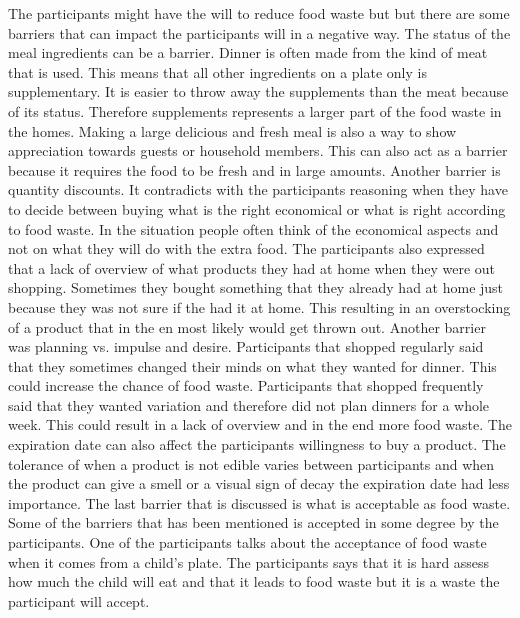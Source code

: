 The participants might have the will to reduce food waste but but there are some barriers that can impact the participants will in a negative way. The status of the meal ingredients can be a barrier. Dinner is often made from the kind of meat that is used. This means that all other ingredients on a plate only is supplementary. It is easier to throw away the supplements than the meat because of its status. Therefore supplements represents a larger part of the food waste in the homes. Making a large delicious and fresh meal is also a way to show appreciation towards guests or household members. This can also act as a barrier because it requires the food to be fresh and in large amounts. Another barrier is quantity discounts. It contradicts with the participants reasoning when they have to decide between buying what is the right economical or what is right according to food waste. In the situation people often think of the economical aspects and not on what they will do with the extra food. The participants also expressed that a lack of overview of what products they had at home when they were out shopping. Sometimes they bought something that they already had at home just because they was not sure if the had it at home. This resulting in an overstocking of a product that in the en most likely would get thrown out. Another barrier was planning vs. impulse and desire. Participants that shopped regularly said that they sometimes changed their minds on what they wanted for dinner. This could increase the chance of food waste. Participants that shopped frequently said that they wanted variation and therefore did not plan dinners for a whole week. This could result in a lack of overview and in the end more food waste. The expiration date can also affect the participants willingness to buy a product. The tolerance of when a product is not edible varies between participants and when the product can give a smell or a visual sign of decay the expiration date had less importance. The last barrier that is discussed is what is acceptable as food waste. Some of the barriers that has been mentioned is accepted in some degree by the participants. One of the participants talks about the acceptance of food waste when it comes from a child's plate. The participants says that it is hard assess how much the child will eat and that it leads to food waste but it is a waste the participant will accept.                         





